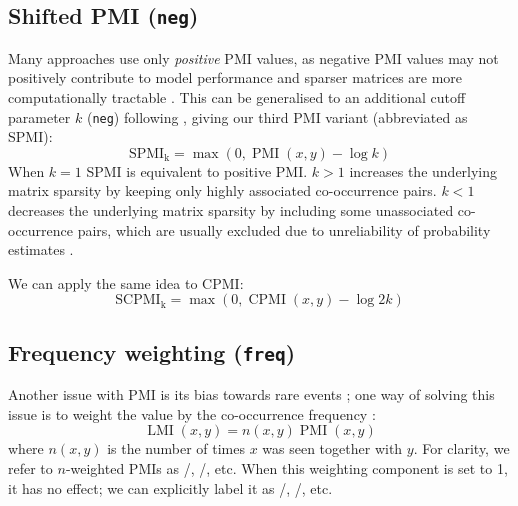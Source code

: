\documentclass[11pt]{article}
\begin{document}


\subsection{Shifted PMI (\texttt{neg})}
\label{sec:shifted-pmi}

Many approaches use only \emph{positive} PMI values, as  negative PMI values may not positively contribute to model performance and sparser matrices are more computationally tractable \cite{Turney:2010:FMV:1861751.1861756}. This can be generalised to an additional cutoff parameter $k$ (\texttt{neg}) following , giving our third PMI variant (abbreviated as SPMI):\footnotemark{}
%
\begin{equation}
  \label{eq:ppmi}
  \operatorname{SPMI_k} = \max (0, \operatorname{PMI}(x, y) - \log k)
\end{equation}
%
When $k = 1$ SPMI is equivalent to positive PMI. $k > 1$ increases the underlying matrix sparsity by keeping only highly associated co-occurrence pairs. $k < 1$ decreases the underlying matrix sparsity by including some unassociated co-occurrence pairs, which are usually excluded due to unreliability of probability estimates \cite{Dagan:1993:CWS:981574.981596}.


We can apply the same idea to CPMI:
%
\begin{equation}
  \label{eq:pcpmi}
  \operatorname{SCPMI_k} = \max (0, \operatorname{CPMI}(x, y) - \log 2k)
\end{equation}

\subsection{Frequency weighting (\texttt{freq})}
\label{sec:frequency-weighting}

Another issue with PMI is its bias towards rare events \cite{TACL570}; one way of solving this issue is to weight the value by the co-occurrence frequency \cite{Evert05}:
%
\begin{equation}
  \label{eq:lmi}
  \operatorname{LMI}(x, y) = n(x, y)\operatorname{PMI}(x, y)
\end{equation}
%
where $n(x, y)$ is the number of times $x$ was seen together with $y$. For clarity, we refer to $n$-weighted PMIs as \NPMI/, \NSPMI/, etc. When this weighting component is set to 1, it has no effect; we can  explicitly label it as \PMI/, \SPMI/, etc.
\end{document}
